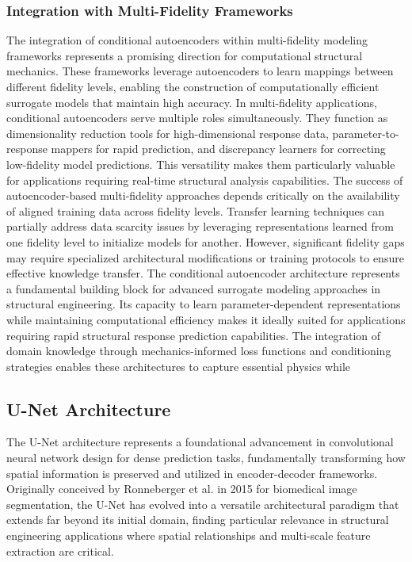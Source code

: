 \documentclass[12pt,a4paper]{report}
\begin{document}
\subsubsection*{Integration with Multi-Fidelity Frameworks}

The integration of conditional autoencoders within multi-fidelity modeling frameworks represents a promising direction for computational structural mechanics. These frameworks leverage autoencoders to learn mappings between different fidelity levels, enabling the construction of computationally efficient surrogate models that maintain high accuracy. In multi-fidelity applications, conditional autoencoders serve multiple roles simultaneously. They function as dimensionality reduction tools for high-dimensional response data, parameter-to-response mappers for rapid prediction, and discrepancy learners for correcting low-fidelity model predictions. This versatility makes them particularly valuable for applications requiring real-time structural analysis capabilities. The success of autoencoder-based multi-fidelity approaches depends critically on the availability of aligned training data across fidelity levels. Transfer learning techniques can partially address data scarcity issues by leveraging representations learned from one fidelity level to initialize models for another. However, significant fidelity gaps may require specialized architectural modifications or training protocols to ensure effective knowledge transfer. The conditional autoencoder architecture represents a fundamental building block for advanced surrogate modeling approaches in structural engineering. Its capacity to learn parameter-dependent representations while maintaining computational efficiency makes it ideally suited for applications requiring rapid structural response prediction capabilities. The integration of domain knowledge through mechanics-informed loss functions and conditioning strategies enables these architectures to capture essential physics while


\subsection{U-Net Architecture}

The U-Net architecture represents a foundational advancement in convolutional neural network design for dense prediction tasks, fundamentally transforming how spatial information is preserved and utilized in encoder-decoder frameworks. Originally conceived by Ronneberger et al. in 2015 for biomedical image segmentation, the U-Net has evolved into a versatile architectural paradigm that extends far beyond its initial domain, finding particular relevance in structural engineering applications where spatial relationships and multi-scale feature extraction are critical.
\end{document}
